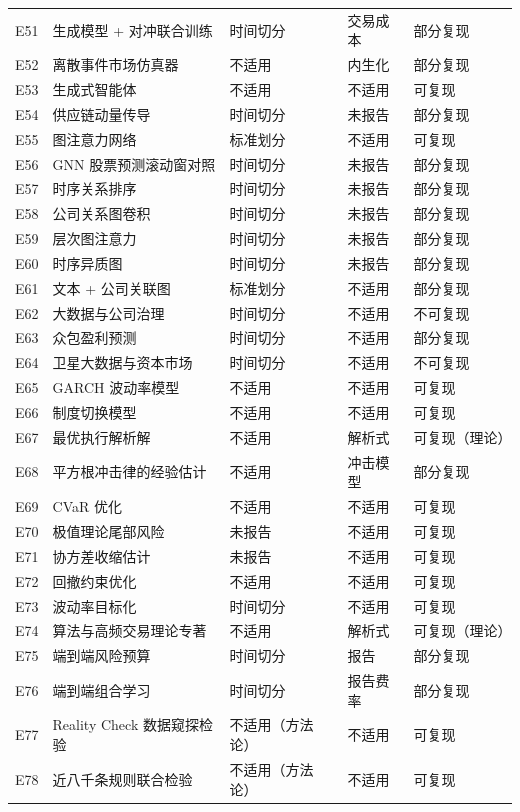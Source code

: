 {\begin{xltabular}{\textwidth}{@{}>{\raggedright\arraybackslash}p{0.7cm}>{\raggedright\arraybackslash}X>{\raggedright\arraybackslash}p{2.6cm}>{\raggedright\arraybackslash}p{2.4cm}>{\raggedright\arraybackslash}p{1.8cm}@{}}
E51 & 生成模型 + 对冲联合训练 & 时间切分 & 交易成本 & 部分复现 \\
E52 & 离散事件市场仿真器 & 不适用 & 内生化 & 部分复现 \\
E53 & 生成式智能体 & 不适用 & 不适用 & 可复现 \\
E54 & 供应链动量传导 & 时间切分 & 未报告 & 部分复现 \\
E55 & 图注意力网络 & 标准划分 & 不适用 & 可复现 \\
E56 & GNN 股票预测滚动窗对照 & 时间切分 & 未报告 & 部分复现 \\
E57 & 时序关系排序 & 时间切分 & 未报告 & 部分复现 \\
E58 & 公司关系图卷积 & 时间切分 & 未报告 & 部分复现 \\
E59 & 层次图注意力 & 时间切分 & 未报告 & 部分复现 \\
E60 & 时序异质图 & 时间切分 & 未报告 & 部分复现 \\
E61 & 文本 + 公司关联图 & 标准划分 & 不适用 & 部分复现 \\
E62 & 大数据与公司治理 & 时间切分 & 不适用 & 不可复现 \\
E63 & 众包盈利预测 & 时间切分 & 不适用 & 部分复现 \\
E64 & 卫星大数据与资本市场 & 时间切分 & 不适用 & 不可复现 \\
E65 & GARCH 波动率模型 & 不适用 & 不适用 & 可复现 \\
E66 & 制度切换模型 & 不适用 & 不适用 & 可复现 \\
E67 & 最优执行解析解 & 不适用 & 解析式 & 可复现（理论） \\
E68 & 平方根冲击律的经验估计 & 不适用 & 冲击模型 & 部分复现 \\
E69 & CVaR 优化 & 不适用 & 不适用 & 可复现 \\
E70 & 极值理论尾部风险 & 未报告 & 不适用 & 可复现 \\
E71 & 协方差收缩估计 & 未报告 & 不适用 & 可复现 \\
E72 & 回撤约束优化 & 不适用 & 不适用 & 可复现 \\
E73 & 波动率目标化 & 时间切分 & 不适用 & 可复现 \\
E74 & 算法与高频交易理论专著 & 不适用 & 解析式 & 可复现（理论） \\
E75 & 端到端风险预算 & 时间切分 & 报告 & 部分复现 \\
E76 & 端到端组合学习 & 时间切分 & 报告费率 & 部分复现 \\
E77 & Reality Check 数据窥探检验 & 不适用（方法论） & 不适用 & 可复现 \\
E78 & 近八千条规则联合检验 & 不适用（方法论） & 不适用 & 可复现 \\

\end{xltabular}}
